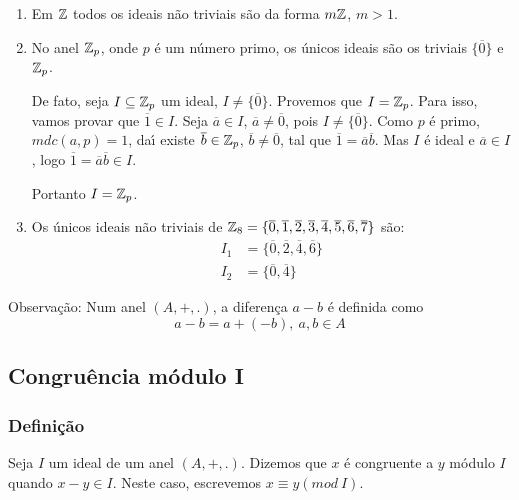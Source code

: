 \begin{exemplos}
	\begin{enumerate}[label={\arabic*})]
		\item Em $\mathbb{Z}$ todos os ideais n{\~a}o triviais s{\~a}o da forma $m\mathbb{Z}$, $m > 1$.
		\item No anel $\mathbb{Z}_p$, onde $p$ {\'e} um n{\'u}mero primo, os {\'u}nicos ideais  s{\~a}o os triviais $\{\overline{0}\}$ e $\mathbb{Z}_p$.
		
		De fato, seja $I \subseteq \mathbb{Z}_p$ um ideal, $I \neq \{\overline{0}\}$. Provemos que $I = \mathbb{Z}_p$. Para isso,
		vamos provar que $\overline{1} \in I$. Seja $\overline{a} \in I$, $\overline{a} \neq \overline{0}$, pois $I \neq \{\overline{0}\}$. Como $p$ {\'e} primo, $mdc(a,p) = 1$, da{\'\i} existe $\overline{b} \in \mathbb{Z}_p$, $\overline{b} \neq \overline{0}$, tal que $\overline{1} = \overline{a}\overline{b}$. Mas $I$ {\'e} ideal e $\overline{a} \in I$, logo $\overline{1} = \overline{a}\overline{b} \in I$.

		Portanto $I = \mathbb{Z}_p$.

		\item Os {\'u}nicos ideais n{\~a}o triviais de $\mathbb{Z}_8 = \{\overline{0}, \overline{1}, \overline{2}, \overline{3}, \overline{4}, \overline{5}, \overline{6}, \overline{7}\}$ s{\~a}o:
		\begin{align*}
			I_1 &= \{\overline{0}, \overline{2}, \overline{4}, \overline{6}\}\\
			I_2 &=\{\overline{0}, \overline{4}\}
		\end{align*}
	\end{enumerate}	
\end{exemplos}


Observa{\c c}{\~a}o: Num anel $(A,+,.)$, a diferen{\c c}a $a-b$ {\'e} definida como
\[a-b=a+(-b),\ a,b\in A\]

\subsection{Congru{\^e}ncia m{\'o}dulo I}
\subsubsection{Defini{\c c}{\~a}o}
\begin{definicao} Seja $I$ um ideal de um anel $(A,+,.)$. Dizemos que $x$ {\'e} congruente a $y$ m{\'o}dulo $I$ quando $x-y\in I$. Neste caso, escrevemos $x\equiv y(mod\ I)$.\end{definicao}

